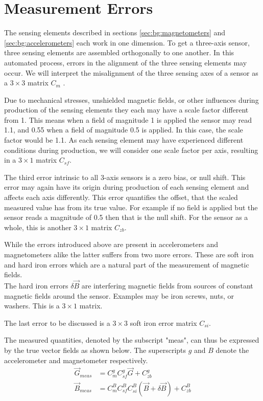 \section{Measurement Errors \label{sec:bg:measurement_errors}}
The sensing elements described in sections \ref{sec:bg:magnetometers} and \ref{sec:bg:accelerometers} each work in one dimension. To get a three-axis sensor, three sensing elements are assembled orthogonally to one another. In this automated process, errors in the alignment of the three sensing elements may occur. We will interpret the misalignment of the three sensing axes of a sensor as a $3\times3$ matrix $C_{m}$ \parencite{magcal}\parencite{non-orthonogality}.

Due to mechanical stresses, unshielded magnetic fields, or other influences during production of the sensing elements they each may have a scale factor different from 1. This means when a field of magnitude 1 is applied the sensor may read 1.1, and 0.55 when a field of magnitude 0.5 is applied. In this case, the scale factor would be 1.1. As each sensing element may have experienced different conditions during production, we will consider one scale factor per axis, resulting in a $3\times1$ matrix $C_{sf}$.

The third error intrinsic to all 3-axis sensors is a zero bias, or null shift. This error may again have its origin during production of each sensing element and affects each axis differently. This error quantifies the offset, that the scaled measured value has from its true value. For example if no field is applied but the sensor reads a magnitude of 0.5 then that is the null shift. For the sensor as a whole, this is another $3\times1$ matrix $C_{zb}$.

While the errors introduced above are present in accelerometers and magnetometers alike the latter suffers from two more errors. These are soft iron and hard iron errors which are a natural part of the measurement of magnetic fields.\\
The hard iron errors $\delta\vec{B}$ are interfering magnetic fields from sources of constant magnetic fields around the sensor. Examples may be iron screws, nuts, or washers. This is a $3\times1$ matrix.

The last error to be discussed is a $3\times3$ soft iron error matrix $C_{si}$.

The measured quantities, denoted by the subscript "meas", can thus be expressed by the true vector fields as shown below. The superscripts $g$ and $B$ denote the accelerometer and magnetometer respectively.
\begin{align}
    \vec{G}_{meas}&=C^g_mC^g_{sf}\vec G+C_{zb}^g \label{eq:bg:g_with_errors}\\
    \vec{B}_{meas}&=C^B_mC^B_{sf}C^B_{si}(\vec{B}+\delta\vec{B})+C_{zb}^B
    \label{eq:bg:b_with_errors}
\end{align}

